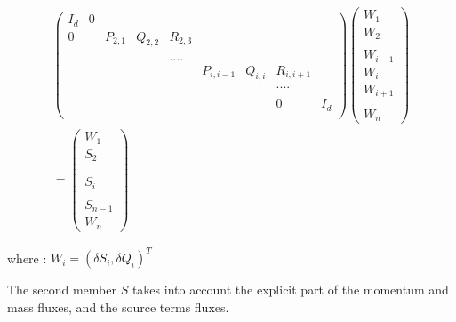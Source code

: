 \begin{eqnarray}
& \left(
         \begin{array}{ccccccccc}
          I_d & 0 & & & & & & & \\
          0 & & P_{2,1} & Q_{2,2} & R_{2,3} & & & & \\
             &   & & & & & & & \\
             & & & & .... & & & & \\
             & & & & & P_{i,i-1} & Q_{i,i} & R_{i,i+1} & \\
             & & & & & & & .... & \\
             & & & & & &  & &  \\
             & & & & & &  & 0 & I_d \\
         \end{array}
         \right)
\left(
            \begin{array}{c}
               W_1\\
               W_2\\
               \\
               W_{i-1} \\
               W_i \\
               W_{i+1} \\
               \\
               W_n
            \end{array}
          \right) & \nonumber \\
     & =
\left(
            \begin{array}{c}
               W_1\\
               S_2\\
               \\
                \\
               S_i \\
               \\
               S_{n-1}\\
               W_n
            \end{array}
          \right) &
\end{eqnarray}

where : $W_i = (\delta S_i , \delta Q_i )^T$

\vspace{0.5cm}

The second member $S$ takes into account the explicit part of the momentum and mass fluxes, and the source terms fluxes.

\vspace{0.5cm}

